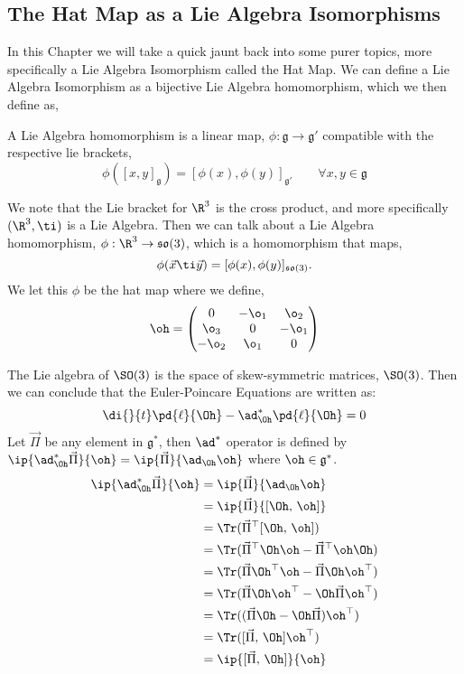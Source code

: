 
\subsection{The Hat Map as a Lie Algebra Isomorphisms}
In this Chapter we will take a quick jaunt back into some purer topics, more specifically a Lie Algebra Isomorphism called the Hat Map. We can define a Lie Algebra Isomorphism as a bijective Lie Algebra homomorphism, which we then define as,
\begin{ndefi}
  A Lie Algebra homomorphism is a linear map, $\phi : \mathfrak{g} \to \mathfrak{g}'$ compatible with the respective lie brackets,
  $$ \phi([x, y]_\mathfrak{g}) = [\phi(x), \phi(y)]_{\mathfrak{g}'} \qquad \forall x, y \in \mathfrak{g} $$
\end{ndefi}

\noindent
We note that the Lie bracket for $\R^3$ is the cross product, and more specifically $(\R^3, \ti)$ is a Lie Algebra. Then we can talk about a Lie Algebra homomorphism, $\phi : \R^3 \to \mathfrak{so}(3)$, which is a homomorphism that maps,
$$ \phi(\vec x \ti \vec y) = [\phi (x), \phi (y)]_{\mathfrak{so}(3)}. $$
We let this $\phi$ be the hat map where we define,
$$ \oh = \begin{pmatrix}
  0 & -\o_1 & \o_2 \\ \o_3 & 0 & -\o_1 \\ -\o_2 & \o_1 & 0
\end{pmatrix} $$

\noindent
The Lie algebra of $\SO(3)$ is the space of skew-symmetric matrices, $\SO(3)$. Then we can conclude that the Euler-Poincare Equations are written as:
$$ \di {}{t} \pd{\ell}{\Oh} - \ad^*_{\Oh}\pd{\ell}{\Oh} = 0 $$
Let $\vec\Pi$ be any element in $\mathfrak{g}^*$, then $\ad^*$ operator is defined by $\ip{\ad_{\Oh}^*\vec\Pi}{\oh} = \ip{\vec\Pi}{\ad_{\Oh}{\oh}}$ where $\oh \in \mathfrak{g}^*$.
{\color{red} \begin{align*}
  \ip{\ad_{\Oh}^*\vec\Pi}{\oh} &= \ip{\vec\Pi}{\ad_{\Oh}{\oh}}\\
  &= \ip{\vec\Pi}{[\Oh,\,\oh]}\\
  &= \Tr(\vec\Pi^\top [\Oh,\,\oh])\\
  &= \Tr(\vec\Pi^\top \Oh\oh - \vec\Pi^\top\oh\Oh)\\
  &= \Tr(\vec\Pi\Oh^\top\oh - \vec\Pi\Oh\oh^\top)\\
  &= \Tr(\vec\Pi\Oh\oh^\top - \Oh\vec\Pi\oh^\top) \\
  &= \Tr((\vec\Pi\Oh - \Oh\vec\Pi)\oh^\top) \\
  &= \Tr([\vec\Pi,\,\Oh]\oh^\top) \\
  &= \ip{[\vec\Pi,\,\Oh]}{\oh}
\end{align*} }

